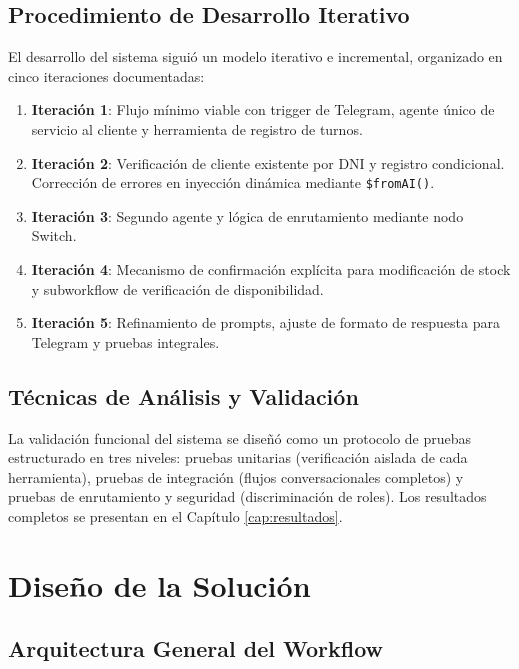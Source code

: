 \documentclass[12pt,a4paper]{report}
\begin{document}
\section{Procedimiento de Desarrollo Iterativo}

El desarrollo del sistema siguió un modelo iterativo e incremental, organizado en cinco iteraciones documentadas:

\begin{enumerate}
  \item \textbf{Iteración 1}: Flujo mínimo viable con trigger de Telegram, agente único de servicio al cliente y herramienta de registro de turnos.
  \item \textbf{Iteración 2}: Verificación de cliente existente por DNI y registro condicional. Corrección de errores en inyección dinámica mediante \texttt{\$fromAI()}.
  \item \textbf{Iteración 3}: Segundo agente y lógica de enrutamiento mediante nodo Switch.
  \item \textbf{Iteración 4}: Mecanismo de confirmación explícita para modificación de stock y subworkflow de verificación de disponibilidad.
  \item \textbf{Iteración 5}: Refinamiento de prompts, ajuste de formato de respuesta para Telegram y pruebas integrales.
\end{enumerate}

\section{Técnicas de Análisis y Validación}

La validación funcional del sistema se diseñó como un protocolo de pruebas estructurado en tres niveles: pruebas unitarias (verificación aislada de cada herramienta), pruebas de integración (flujos conversacionales completos) y pruebas de enrutamiento y seguridad (discriminación de roles). Los resultados completos se presentan en el Capítulo \ref{cap:resultados}.

\chapter{Diseño de la Solución}

\section{Arquitectura General del Workflow}
\end{document}
